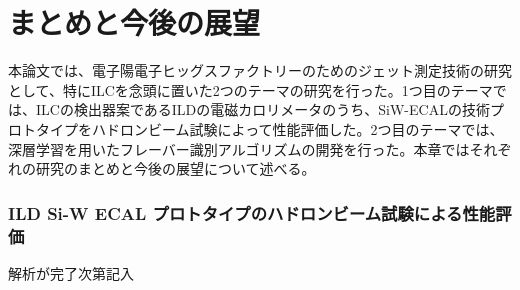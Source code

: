 
\chapter{まとめと今後の展望} \label{sec:Conclusion}
本論文では、電子陽電子ヒッグスファクトリーのためのジェット測定技術の研究として、特にILCを念頭に置いた2つのテーマの研究を行った。1つ目のテーマでは、ILCの検出器案であるILDの電磁カロリメータのうち、SiW-ECALの技術プロトタイプをハドロンビーム試験によって性能評価した。2つ目のテーマでは、深層学習を用いたフレーバー識別アルゴリズムの開発を行った。本章ではそれぞれの研究のまとめと今後の展望について述べる。
\subsection*{ILD Si-W ECAL プロトタイプのハドロンビーム試験による性能評価}
解析が完了次第記入

